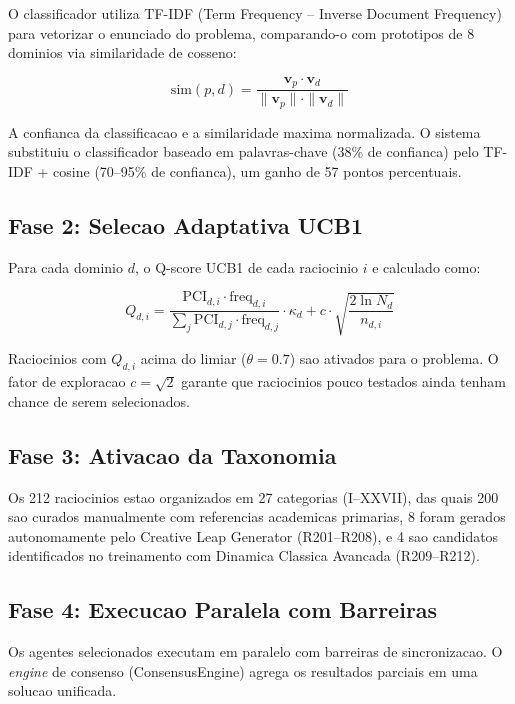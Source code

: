 \documentclass[5p]{elsarticle}
\begin{document}
O classificador utiliza TF-IDF (Term Frequency -- Inverse Document Frequency)
para vetorizar o enunciado do problema, comparando-o com prototipos de 8 dominios
via similaridade de cosseno:

\begin{equation}
\text{sim}(p, d) = \frac{\mathbf{v}_p \cdot \mathbf{v}_d}{\|\mathbf{v}_p\| \cdot \|\mathbf{v}_d\|}
\label{eq:cosine}
\end{equation}

A confianca da classificacao e a similaridade maxima normalizada. O sistema
substituiu o classificador baseado em palavras-chave (38\% de confianca) pelo
TF-IDF + cosine (70--95\% de confianca), um ganho de 57 pontos percentuais.

\subsection{Fase 2: Selecao Adaptativa UCB1}

Para cada dominio $d$, o Q-score UCB1 de cada raciocinio $i$ e calculado como:

\begin{equation}
Q_{d,i} = \frac{\text{PCI}_{d,i} \cdot \text{freq}_{d,i}}{\sum_j \text{PCI}_{d,j} \cdot \text{freq}_{d,j}} \cdot \kappa_d + c \cdot \sqrt{\frac{2 \ln N_d}{n_{d,i}}}
\label{eq:qscore}
\end{equation}

Raciocinios com $Q_{d,i}$ acima do limiar ($\theta = 0.7$) sao ativados para o
problema. O fator de exploracao $c = \sqrt{2}$ garante que raciocinios pouco
testados ainda tenham chance de serem selecionados.

\subsection{Fase 3: Ativacao da Taxonomia}

Os 212 raciocinios estao organizados em 27 categorias (I--XXVII), das quais 200
sao curados manualmente com referencias academicas primarias, 8 foram gerados
autonomamente pelo Creative Leap Generator (R201--R208), e 4 sao candidatos
identificados no treinamento com Dinamica Classica Avancada (R209--R212).

\subsection{Fase 4: Execucao Paralela com Barreiras}

Os agentes selecionados executam em paralelo com barreiras de sincronizacao. O
\textit{engine} de consenso (ConsensusEngine) agrega os resultados parciais em
uma solucao unificada.
\end{document}
